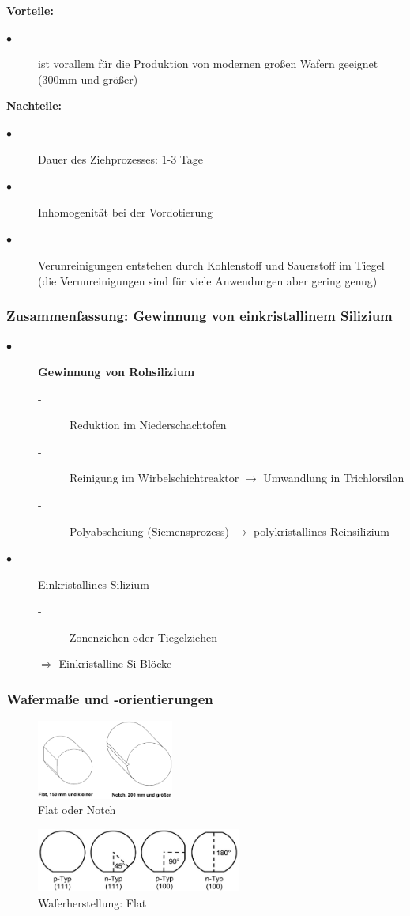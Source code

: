 		\textbf{Vorteile:}
		\begin{description}
			\item[$\bullet$] ist vorallem für die Produktion von modernen großen Wafern geeignet (300mm und größer)
		\end{description}
		\textbf{Nachteile:}
		\begin{description}
			\item[$\bullet$] Dauer des Ziehprozesses: 1-3 Tage
			\item[$\bullet$] Inhomogenität bei der Vordotierung
			\item[$\bullet$] Verunreinigungen entstehen durch Kohlenstoff und Sauerstoff im Tiegel (die Verunreinigungen sind für viele Anwendungen aber gering genug)
		\end{description}
		
	\subsubsection{Zusammenfassung: Gewinnung von einkristallinem Silizium}
		\begin{description}
			\item[$\bullet$] \textbf{Gewinnung von Rohsilizium}
			\begin{description}
				\item[-] Reduktion im Niederschachtofen
				\item[-] Reinigung im Wirbelschichtreaktor $\rightarrow$ Umwandlung in Trichlorsilan
				\item[-] Polyabscheiung (Siemensprozess) $\rightarrow$ polykristallines Reinsilizium
			\end{description}
			\item[$\bullet$]Einkristallines Silizium
			\begin{description}
				\item[-] Zonenziehen oder Tiegelziehen
			\end{description}
			$\Rightarrow$ Einkristalline Si-Blöcke
		\end{description}
		
	\subsubsection{Wafermaße und -orientierungen}
		\begin{figure}[h!]
			\centering
			\includegraphics[width=0.4\textwidth]{Kapitel/Kap02/wafermasse.PNG}
			\caption{Flat oder Notch}
			\label{02_flat_notch}
		\end{figure}
		
		\begin{figure}[h!]
			\centering
			\includegraphics[width=0.6\textwidth]{Kapitel/Kap02/orientierungen.PNG}
			\caption{Waferherstellung: Flat}
			\label{02_flat}
		\end{figure}

